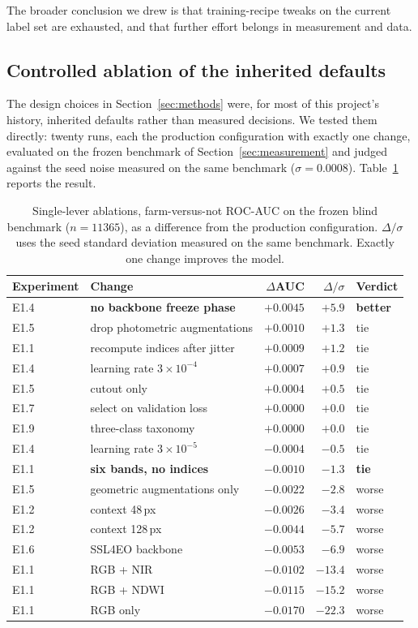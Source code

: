 \documentclass[11pt,a4paper]{article}
\begin{document}
The broader conclusion we drew is that training-recipe tweaks on the current
label set are exhausted, and that further effort belongs in measurement and data.

\subsection{Controlled ablation of the inherited defaults}
\label{sec:ablations}

The design choices in Section~\ref{sec:methods} were, for most of this project's
history, inherited defaults rather than measured decisions. We tested them
directly: twenty runs, each the production configuration with exactly one change,
evaluated on the frozen benchmark of Section~\ref{sec:measurement} and judged
against the seed noise measured on the same benchmark ($\sigma = 0.0008$).
Table~\ref{tab:ablations} reports the result.

\begin{table}[t]
\centering
\small
\caption{Single-lever ablations, farm-versus-not ROC-AUC on the frozen blind
benchmark ($n = \num{11365}$), as a difference from the production
configuration. $\Delta/\sigma$ uses the seed standard deviation measured on the
same benchmark. Exactly one change improves the model.}
\label{tab:ablations}
\begin{tabular}{llrrl}
\toprule
Experiment & Change & $\Delta$AUC & $\Delta/\sigma$ & Verdict \\
\midrule
E1.4 & \textbf{no backbone freeze phase} & $\mathbf{+0.0045}$ & $+5.9$ & \textbf{better} \\
E1.5 & drop photometric augmentations & $+0.0010$ & $+1.3$ & tie \\
E1.1 & recompute indices after jitter & $+0.0009$ & $+1.2$ & tie \\
E1.4 & learning rate $3\times10^{-4}$ & $+0.0007$ & $+0.9$ & tie \\
E1.5 & cutout only & $+0.0004$ & $+0.5$ & tie \\
E1.7 & select on validation loss & $+0.0000$ & $+0.0$ & tie \\
E1.9 & three-class taxonomy & $+0.0000$ & $+0.0$ & tie \\
E1.4 & learning rate $3\times10^{-5}$ & $-0.0004$ & $-0.5$ & tie \\
E1.1 & \textbf{six bands, no indices} & $-0.0010$ & $-1.3$ & \textbf{tie} \\
E1.5 & geometric augmentations only & $-0.0022$ & $-2.8$ & worse \\
E1.2 & context 48\,px & $-0.0026$ & $-3.4$ & worse \\
E1.2 & context 128\,px & $-0.0044$ & $-5.7$ & worse \\
E1.6 & SSL4EO backbone & $-0.0053$ & $-6.9$ & worse \\
E1.1 & RGB + NIR & $-0.0102$ & $-13.4$ & worse \\
E1.1 & RGB + NDWI & $-0.0115$ & $-15.2$ & worse \\
E1.1 & RGB only & $-0.0170$ & $-22.3$ & worse \\
\bottomrule
\end{tabular}
\end{table}
\end{document}
